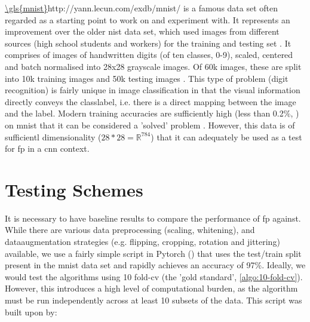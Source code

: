 \url{\gls{mnist}}{http://yann.lecun.com/exdb/mnist/} is a famous data set often regarded as a starting point to work on and experiment with. It represents an improvement over the older \gls{nist} data set, which used images from different sources (high school students and workers) for the training and testing set \cite{nist}. It comprises of images of handwritten digits (of ten classes, 0-9), scaled, centered and batch normalised into 28x28 grayscale images. Of 60k images, these are split into 10k training images and 50k testing images \cite{mnist}. This type of problem (digit recognition) is fairly unique in image classification in that the visual information directly conveys the \gls{classlabel}, i.e. there is a direct mapping between the image and the label. Modern training accuracies are sufficiently high (less than 0.2\%, \cite{mnist_sota}) on \gls{mnist} that it can be considered a 'solved' problem \cite{mnist_sota_web}. However, this data is of sufficientl dimensionality ($28 * 28 = \mathds{R}^{784}$) that it can adequately be used as a test for \gls{fp} in a \gls{cnn} context. 
 \bigskip

%

%

\section{Testing Schemes}
  
It is necessary to have baseline results to compare the performance of \gls{fp} against. While there are various data preprocessing (scaling, whitening), and \gls{dataaugmentation} strategies (e.g. flipping, cropping, rotation and jittering)  available, we use a fairly simple script in Pytorch (\cite{mnist_script}) that uses the test/train split present in the  \gls{mnist} data set and rapidly achieves an accuracy of 97\%. Ideally, we would test the algorithms using 10 fold-\gls{cv} (the 'gold standard', \ref{algo:10-fold-cv}). However, this introduces a high level of computational burden, as the algorithm must be run independently across at least 10 subsets of the data. This script was built upon by:

